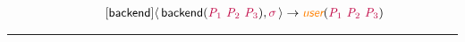 \documentclass[10pt,leqno,fleqn]{article}
\newcommand{\artVariable}[1]{\mbox{\color{purple}\em #1\/}}
\newcommand{\artConstructor}[1]{\mbox{\sf #1}}
\newcommand{\artSpecial}[1]{\mbox{\color{orange}\sf\em #1}}
\begin{document}
\begin{equation}
\tag*{[\artConstructor{\sf backend}]}
\begin{split}\langle\, \artConstructor{\sf backend}(\artVariable{P$_{1}$}\ \artVariable{P$_{2}$}\ \artVariable{P$_{3}$}), \artVariable{$\sigma$}\,\rangle \rightarrow \artSpecial{user}(\artVariable{P$_{1}$}\ \artVariable{P$_{2}$}\ \artVariable{P$_{3}$})
\end{split}
\end{equation}

\hrule
\end{document}
